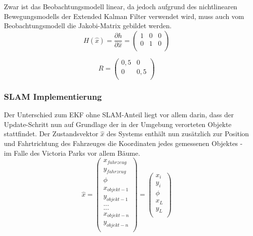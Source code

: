 \documentclass[11pt]{scrartcl}
\begin{document}
{Zwar ist das Beobachtungsmodell linear, da jedoch aufgrund des nichtlinearen Bewegungsmodells der Extended Kalman Filter verwendet wird, muss auch vom Beobachtungsmodell die Jakobi-Matrix gebildet werden.
\begin{equation}\label{EKF-Observation-Model-Jakobi-Matrix}
	H(\hat{x})= \frac{\partial h}{\partial \hat{x}} = \begin{pmatrix}
		1 & 0 & 0 \\
		0 & 1 & 0 \\
	\end{pmatrix}
\end{equation}

\begin{equation}\label{GPS-Messungenauigkeits-Matrix}
	R = \begin{pmatrix}
		0,5 & 0 \\
		0 & 0,5 \\
	\end{pmatrix}
\end{equation}

\subsubsection{SLAM Implementierung}\label{SLAM Implementierung}
Der Unterschied zum EKF ohne SLAM-Anteil liegt vor allem darin, dass der Update-Schritt nun auf Grundlage der in der Umgebung verorteten Objekte stattfindet. Der Zustandsvektor $\hat{x}$ des Systems enthält nun zusätzlich zur Position und Fahrtrichtung des Fahrzeuges die Koordinaten jedes gemessenen Objektes - im Falle des Victoria Parks vor allem Bäume. 
\begin{equation}\label{SLAM-State-Vector}
	\hat{x} = \begin{pmatrix}
		x_{fahrzeug} \\
		y_{fahrzeug} \\
		\phi \\
		x_{objekt-1} \\
		y_{objekt-1} \\
		... \\
		... \\
		x_{objekt-n} \\
		y_{objekt-n} \\
	  \end{pmatrix} = \begin{pmatrix}
		  x_i \\
		  y_i \\
		  \phi \\
		  x_L \\
		  y_L \\
	  \end{pmatrix}
\end{equation}

}
\end{document}
